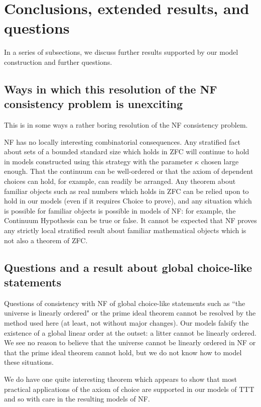 \documentclass{article}
\theoremstyle{definition}
\theoremstyle{remark}
\begin{document}
\newpage

\section{Conclusions, extended results, and questions}

In a series of subsections, we discuss further results supported by our model construction and further questions.

\subsection{Ways in which this resolution of the NF consistency problem is unexciting}

This is in some ways a rather boring resolution of the NF consistency problem.

NF has no locally interesting combinatorial consequences.   Any stratified fact about sets of a bounded standard size which holds in ZFC will continue to hold in models constructed using this strategy with the parameter $\kappa$ chosen large enough.
That the continuum can be well-ordered or that the axiom of dependent choices can hold, for example, can readily be arranged.  Any theorem about familiar objects such as real numbers which holds in ZFC can be relied upon to hold in our models
(even if it requires Choice to prove), and any situation which is possible for familiar objects is possible in models of NF:  for example, the Continuum Hypothesis can be true or false.  It cannot be expected that NF proves any strictly local stratified result about familiar mathematical objects which is not also a theorem of ZFC.

\subsection{Questions and a result about global choice-like statements}

Questions of consistency with NF of global choice-like statements such as ``the universe is linearly ordered"  or the prime ideal theorem cannot be resolved by the method used here (at least, not without major changes).  Our models falsify the existence of a global linear order at the outset:  a litter cannot be linearly ordered.  We see no reason to believe that the universe cannot be linearly ordered in NF or that the prime ideal theorem cannot hold, but we do not know how to model these situations.

We do have one quite interesting theorem which appears to show that most practical applications of the axiom of choice are supported in our models of TTT and so with care in the resulting models of NF.
\end{document}
